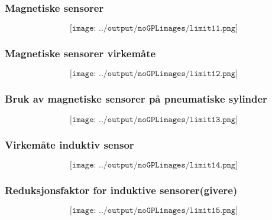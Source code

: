 \documentclass[aspectratio=169,xcolor=dvipsnames]{beamer}
\begin{document}
\begin{frame}
	\frametitle{Magnetiske sensorer}
	$$\texttt{[image: ../output/noGPLimages/limit11.png]}$$
\end{frame}
\begin{frame}
	\frametitle{Magnetiske sensorer virkemåte}
	$$\texttt{[image: ../output/noGPLimages/limit12.png]}$$
\end{frame}
\begin{frame}
	\frametitle{Bruk av magnetiske sensorer på pneumatiske sylinder}
	$$\texttt{[image: ../output/noGPLimages/limit13.png]}$$
\end{frame}
\begin{frame}
	\frametitle{Virkemåte induktiv sensor}
	$$\texttt{[image: ../output/noGPLimages/limit14.png]}$$
\end{frame}
\begin{frame}
	\frametitle{Reduksjonsfaktor for induktive sensorer(givere)}
	$$\texttt{[image: ../output/noGPLimages/limit15.png]}$$
\end{frame}
\end{document}
